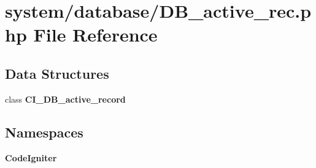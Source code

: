 \section{system/database/\-D\-B\-\_\-active\-\_\-rec.php File Reference}
\label{_d_b__active__rec_8php}
\subsection*{Data Structures}
\begin{DoxyCompactItemize}
\item 
class {\bf C\-I\-\_\-\-D\-B\-\_\-active\-\_\-record}
\end{DoxyCompactItemize}
\subsection*{Namespaces}
\begin{DoxyCompactItemize}
\item 
{\bf Code\-Igniter}
\end{DoxyCompactItemize}
